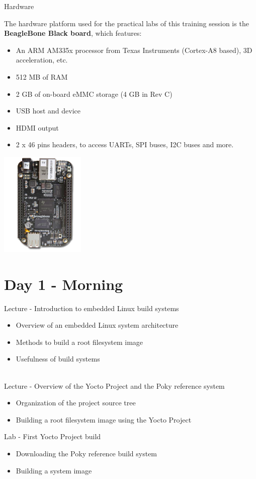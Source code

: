 \documentclass[a4paper,12pt,obeyspaces,spaces,hyphens]{article}
\begin{document}
\feagendatwocolumn
{Hardware}
{
  The hardware platform used for the practical labs of this training
  session is the {\bf BeagleBone Black board}, which features:

  \begin{itemize}
  \item An ARM AM335x processor from Texas Instruments (Cortex-A8
    based), 3D acceleration, etc.
  \item 512 MB of RAM
  \item 2 GB of on-board eMMC storage
        \newline(4 GB in Rev C)
  \item USB host and device
  \item HDMI output
  \item 2 x 46 pins headers, to access UARTs, SPI buses, I2C buses
    and more.
  \end{itemize}
}
{}
{
  \begin{center}
    \includegraphics[height=5cm]{../slides/beagleboneblack-board/beagleboneblack.png}
  \end{center}
}

\section{Day 1 - Morning}

\feagendaonecolumn
{Lecture - Introduction to embedded Linux build systems}
{
  \begin{itemize}
  \item Overview of an embedded Linux system architecture
  \item Methods to build a root filesystem image
  \item Usefulness of build systems
  \end{itemize}
}
\\
\feagendatwocolumn
{Lecture - Overview of the Yocto Project and the Poky reference system}
{
  \begin{itemize}
  \item Organization of the project source tree
  \item Building a root filesystem image using the Yocto Project
  \end{itemize}
}
{Lab - First Yocto Project build}
{
  \begin{itemize}
  \item Downloading the Poky reference build system
  \item Building a system image
 \end{itemize}
}
\end{document}
